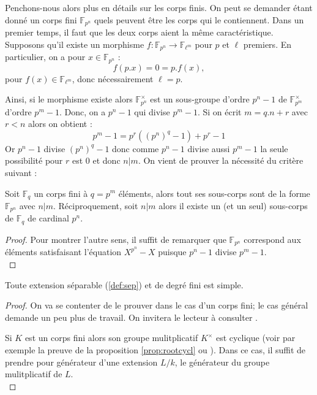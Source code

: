 \documentclass[a4paper]{article} %
\numberwithin{section}{part}
\numberwithin{equation}{section}
\newcommand\GF[1]{\mathbb{F}_{#1}}
\begin{document}
Penchons-nous alors plus en détails sur les corps finis. On peut se demander
étant donné un corps fini $\GF{p^n}$ quels peuvent être les corps qui le
contiennent. Dans un premier temps, il faut que les deux corps aient la même
caractéristique. Supposons qu'il existe un morphisme $f : \GF{p^n} \to 
\GF{\ell^m}$ pour $p$ et $\ell$ premiers. En particulier, on a pour 
$x\in\GF{p^n}$ :
\begin{equation}
f(p.x) = 0 = p.f(x),
\end{equation}
pour $f(x)\in\GF{\ell^m}$, donc nécessairement $\ell = p$.\par
Ainsi, si le morphisme existe alors $\GF{p^n}^{\times}$ est un sous-groupe
d'ordre $p^n - 1$ de $\GF{p^m}^{\times}$ d'ordre $p^m - 1$. Donc, on a $p^n - 1$
qui divise $p^m - 1$. Si on écrit $m = q.n + r$ avec $r < n$ alors on obtient :
\[p^m - 1 = p^r((p^n)^q - 1) + p^r - 1\]
Or $p^n - 1$ divise $(p^n)^q - 1$ donc comme $p^n - 1$ divise aussi $p^m - 1$ la
seule possibilité pour $r$ est $0$ et donc $n|m$. On vient de prouver la
nécessité du critère suivant :

\begin{prop}
Soit $\GF{q}$ un corps fini à $q = p^m$ éléments, alors tout ses sous-corps sont
de la forme $\GF{p^n}$ avec $n|m$. Réciproquement, soit $n|m$ alors il existe un
(et un seul) sous-corps de $\GF{q}$ de cardinal $p^n$.
\end{prop}
\begin{proof}
Pour montrer l'autre sens, il suffit de remarquer que $\GF{p^n}$ correspond aux
éléments satisfaisant l'équation $X^{p^n} - X$ puisque $p^n - 1$ divise $p^m -
1$.\\
\end{proof}

\begin{thm}
\label{th:elemprim}
Toute extension séparable (\ref{def:sep}) et de degré fini est simple.
\end{thm}
\begin{proof}
On va se contenter de le prouver dans le cas d'un corps fini; le cas général
demande un peu plus de travail. On invitera le lecteur à consulter
\cite[p.~87]{Esc}.\par
Si $K$ est un corps fini alors son groupe mulitplicatif $K^{\times}$ est
cyclique (voir par exemple la preuve de la proposition \ref{prop:rootcycl} ou
\cite[p.~50]{LiNi1}). Dans ce cas, il suffit de prendre pour générateur d'une
extension $L/k$, le générateur du groupe mulitplicatif de $L$.\\
\end{proof}
\end{document}
